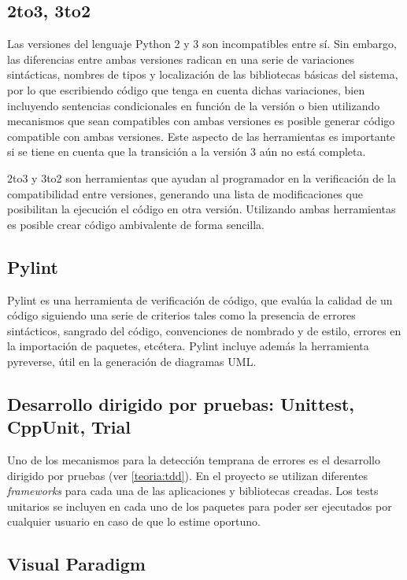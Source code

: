 \subsection{2to3, 3to2}

Las versiones del lenguaje Python 2 y 3 son incompatibles entre sí. Sin embargo, las diferencias entre ambas versiones radican en una serie de variaciones sintácticas, nombres de tipos y localización de las bibliotecas básicas del sistema, por lo que escribiendo código que tenga en cuenta dichas variaciones, bien incluyendo sentencias condicionales en función de la versión o bien utilizando mecanismos que sean compatibles con ambas versiones es posible generar código compatible con ambas versiones. Este aspecto de las herramientas es importante si se tiene en cuenta que la transición a la versión 3 aún no está completa.

2to3 y 3to2 son herramientas que ayudan al programador en la verificación de la compatibilidad entre versiones, generando una lista de modificaciones que posibilitan la ejecución el código en otra versión. Utilizando ambas herramientas es posible crear código ambivalente de forma sencilla.

\subsection{Pylint}

Pylint es una herramienta de verificación de código, que evalúa la calidad de un código siguiendo una serie de criterios tales como la presencia de errores sintácticos, sangrado del código, convenciones de nombrado y de estilo, errores en la importación de paquetes, etcétera. Pylint incluye además la herramienta pyreverse, útil en la generación de diagramas UML.

\subsection{Desarrollo dirigido por pruebas: Unittest, CppUnit, Trial}

Uno de los mecanismos para la detección temprana de errores es el desarrollo dirigido por pruebas (ver \ref{teoria:tdd}). En el proyecto se utilizan diferentes \textit{frameworks} para cada una de las aplicaciones y bibliotecas creadas. Los tests unitarios se incluyen en cada uno de los paquetes para poder ser ejecutados por cualquier usuario en caso de que lo estime oportuno.

\subsection{Visual Paradigm}
\citationneeded[TODO]

